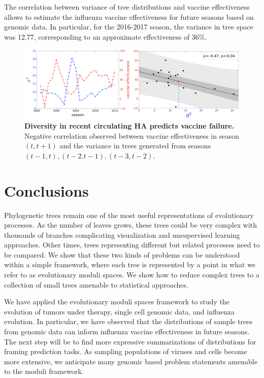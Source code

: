 \documentclass[a4paper,11pt]{article}
\begin{document}
The correlation between variance of tree distributions and vaccine effectiveness allows to estimate the influenza vaccine effectiveness for future seasons based on genomic data. In particular, for the 2016-2017 season, the variance in tree space was 12.77, corresponding to an approximate effectiveness of 36\%. 

\begin{figure}
    \centering
    \includegraphics[width=\linewidth]{../figures/influenza_VE.png}
    \caption{{\bf Diversity in recent circulating HA predicts vaccine failure.} Negative correlation observed between vaccine effectiveness in season $(t, t+1)$ and the variance in trees generated from seasons $(t-1,t), (t-2. t-1), (t-3,t-2)$.}
    \label{fig:flu_VE}
\end{figure} 


\section{Conclusions}\label{sec:conclusions}

Phylogenetic trees remain one of the most useful representations of evolutionary processes.
As the number of leaves grows, these trees could be very complex with thousands of branches complicating visualization and unsupervised learning approaches.
Other times, trees representing different but related processes need to be compared.
We show that these two kinds of problems can be understood within a simple framework, where each tree is represented by a point in what we refer to as evolutionary moduli spaces.
We show how to reduce complex trees to a collection of small trees amenable to statistical approaches.

We have applied the evolutionary moduli spaces framework to study the evolution of tumors under therapy, single cell genomic data, and influenza evolution.
In particular, we have observed that the distributions of sample trees from genomic data can inform influenza vaccine effectiveness in future seasons.
The next step will be to find more expressive summarizations of distributions for framing prediction tasks.
As sampling populations of viruses and cells become more extensive, we anticipate many genomic based problem statements amenable to the moduli framework.
\end{document}
